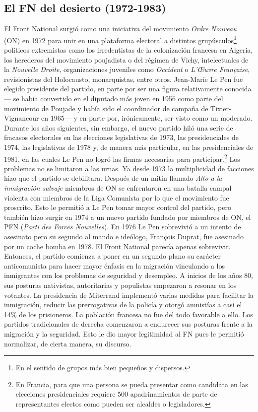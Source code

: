 \subsection{El FN del desierto (1972-1983)}

El Front National surgió como una iniciativa del movimiento \textit{Ordre Nouveau} (ON) en 1972 para unir en una plataforma electoral a distintos grupúsculos\footnote{En el sentido de grupos más bien pequeños y dispersos.} políticos extremistas como los irredentistas de la colonización francesa en Algeria, los herederos del movimiento poujadista o del régimen de Vichy, intelectuales de la \textit{Nouvelle Droite}, organizaciones juveniles como \textit{Occident} o \textit{L'\OE{}uvre Française}, revisionistas del Holocausto, monarquistas, entre otros. Jean-Marie Le Pen fue elegido presidente del partido, en parte por ser una figura relativamente conocida--- se había convertido en el diputado más joven en 1956 como parte del movimiento de Poujade y había sido el coordinador de campaña de Tixier-Vignancour en 1965--- y en parte por, irónicamente, ser visto como un moderado.\\ 

Durante los años siguientes, sin embargo, el nuevo partido hiló una serie de fracasos electorales en las elecciones legislativas de 1973, las presidenciales de 1974, las legislativas de 1978 y, de manera más particular, en las presidenciales de 1981, en las cuales Le Pen no logró las firmas necesarias para participar.\footnote{En Francia, para que una persona se pueda presentar como candidata en las elecciones presidenciales requiere 500 apadrinamientos de parte de representantes electos como pueden ser alcaldes o legisladores.} Los problemas no se limitaron a las urnas. Ya desde 1973 la multiplicidad de facciones hizo que el partido se debilitara. Después de un mitin llamado \textit{Alto a la inmigración salvaje} miembros de ON se enfrentaron en una batalla campal violenta con miembros de la Liga Comunista por lo que el movimiento fue proscrito. Esto le permitió a Le Pen tomar mayor control del partido, pero también hizo surgir en 1974 a un nuevo partido fundado por miembros de ON, el PFN (\textit{Parti des Forces Nouvelles}). En 1976 Le Pen sobrevivió a un intento de asesinato pero su segundo al mando e ideólogo, François Duprat, fue asesinado por un coche bomba en 1978. El Front National parecía apenas sobrevivir.\\

Entonces, el partido comienza a poner en un segundo plano su carácter anticomunista para hacer mayor énfasis en la migración vinculando a los inmigrantes con los problemas de seguridad y desempleo. A inicios de los años 80, sus posturas nativistas, autoritarias y populistas empezaron a resonar en los votantes. La presidencia de Miterrand implementó varias medidas para facilitar la inmigración, reducir las prerrogativas de la policía y otorgó amnistías a casi el 14\% de los prisioneros. La población francesa no fue del todo favorable a ello. Los partidos tradicionales de derecha comenzaron a endurecer sus posturas frente a la migración y la seguridad. Esto le dio mayor legitimidad al FN pues le permitió normalizar, de cierta manera, su discurso.\\ 

